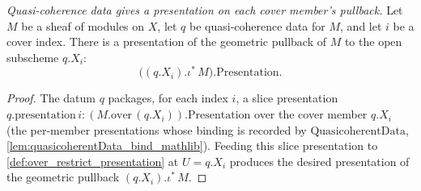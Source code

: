 \begin{definition}
  \label{def:presentation_pullback_iota_of_quasicoherentData}
  \textit{Quasi-coherence data gives a presentation on each cover member's pullback.}
  Let \(M\) be a sheaf of modules on \(X\), let \(q\) be quasi-coherence data for
  \(M\), and let \(i\) be a cover index. There is a presentation of the geometric
  pullback of \(M\) to the open subscheme \(q.X_i\):
  \[
    \bigl((q.X_i).\iota^{*}\,M\bigr).\mathrm{Presentation} .
  \]
\end{definition}
\begin{proof}
  The datum \(q\) packages, for each index \(i\), a slice presentation
  \(q.\mathrm{presentation}\,i : (M.\mathrm{over}\,(q.X_i)).\mathrm{Presentation}\)
  over the cover member \(q.X_i\) (the per-member presentations whose binding is
  recorded by \(\mathrm{QuasicoherentData}\), \cref{lem:quasicoherentData_bind_mathlib}).
  Feeding this slice presentation to \cref{def:over_restrict_presentation} at
  \(U = q.X_i\) produces the desired presentation of the geometric pullback
  \((q.X_i).\iota^{*}\,M\).
\end{proof}



